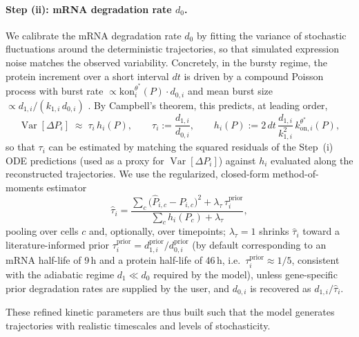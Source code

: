 \documentclass[a4paper, 11pt]{article}
\theoremstyle{plain}
\theoremstyle{remark}
\newcommand*{\firstreview}[1]{{\color{black}#1}}
\begin{document}
\paragraph{Step (ii): mRNA degradation rate $d_0$.}
We calibrate the mRNA degradation rate $d_0$ by fitting the variance of stochastic fluctuations around the deterministic trajectories, so that simulated expression noise matches the observed variability. \firstreview{Concretely, in the bursty regime, the protein increment over a short interval $dt$ is driven
by a compound Poisson process with burst rate $\propto \mathrm{kon}_i^{\theta^*}(P)\cdot d_{0,i}$
and mean burst size $\propto d_{1,i}/(k_{1,i}\,d_{0,i})$ \cite{ventre2022reverse}. By Campbell's theorem, this predicts,
at leading order,
\begin{equation}
\operatorname{Var}[\Delta P_i] \;\approx\; \tau_i \, h_i(P), \qquad
\tau_i := \frac{d_{1,i}}{d_{0,i}}, \qquad
h_i(P) := 2\,dt\,\frac{d_{1,i}}{k_{1,i}^2}\,k_{\mathrm{on},i}^{\theta^*}(P),
\label{eq:eps_moment}
\end{equation}
so that $\tau_i$ can be estimated by matching the squared residuals of the Step~(i) ODE predictions (used as a proxy for $\operatorname{Var}[\Delta P_i]$) against $h_i$ evaluated along the reconstructed trajectories. We use the regularized, closed-form method-of-moments estimator
\begin{equation}
\hat\tau_i = \frac{\sum_{c} \big(\hat P_{i,c} - P_{i,c}\big)^2 + \lambda_\tau\, \tau_i^{\mathrm{prior}}}
{\sum_{c} h_i(P_c) + \lambda_\tau},
\label{eq:eps_estimator}
\end{equation}
pooling over cells $c$ and, optionally, over timepoints; $\lambda_\tau = 1$ shrinks
$\hat\tau_i$ toward a literature-informed prior $\tau_i^{\mathrm{prior}} =
d_{1,i}^{\mathrm{prior}}/d_{0,i}^{\mathrm{prior}}$ (by default corresponding to an mRNA
half-life of 9\,h and a protein half-life of 46\,h, i.e.\ $\tau_i^{\mathrm{prior}}
\approx 1/5$, consistent with the adiabatic regime $d_1 \ll d_0$ required by the model), unless gene-specific prior degradation rates are
supplied by the user, and $d_{0,i}$ is recovered as $d_{1,i}/\hat\tau_i$.
}

These refined kinetic parameters are thus built such that the model generates trajectories with realistic timescales and levels of stochasticity.
\end{document}
